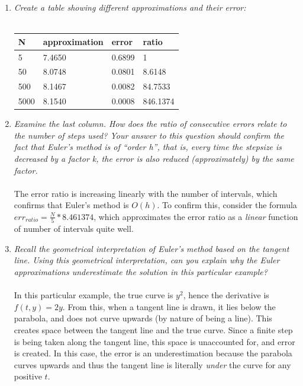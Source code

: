 \begin{enumerate}
    \item \emph{Create a table showing different approximations and their error:} \\ \\
        \begin{tabular}{l|l|l|l}
         N    & approximation & error & ratio \\
         \hline
         5    & 7.4650 & 0.6899 & 1 \\
         50   & 8.0748 & 0.0801 & 8.6148 \\
         500  & 8.1467 & 0.0082 & 84.7533 \\
         5000 & 8.1540 & 0.0008 & 846.1374
        \end{tabular}
    \item \emph{Examine the last column. How does the ratio of consecutive errors relate to the number of steps used? Your answer to this question should confirm the fact that Euler’s method is of “order h”, that is, every time the stepsize is decreased by a factor k, the error is also reduced (approximately) by the same factor.} \\ \\
        The error ratio is increasing linearly with the number of intervals, which confirms that Euler's method is $O(h)$. To confirm this, consider the formula $err_{ratio} = \frac{N}{5} * 8.461374$, which approximates the error ratio as a \emph{linear} function of number of intervals quite well.
    \item \emph{Recall the geometrical interpretation of Euler’s method based on the tangent line. Using this geometrical interpretation, can you explain why the Euler approximations underestimate the solution in this particular example?} \\ \\
        In this particular example, the true curve is $y^2$, hence the derivative is $f(t, y) = 2y$. From this, when a tangent line is drawn, it lies below the parabola, and does not curve upwards (by nature of being a line). This creates space between the tangent line and the true curve. Since a finite step is being taken along the tangent line, this space is unaccounted for, and error is created. In this case, the error is an underestimation because the parabola curves upwards and thus the tangent line is literally \emph{under} the curve for any positive $t$.  
\end{enumerate}
